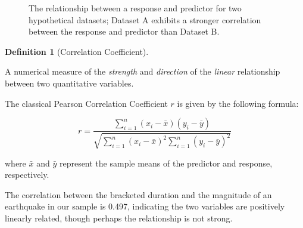\documentclass[
  letterpaper,
  DIV=11,
  numbers=noendperiod]{scrreprt}
\theoremstyle{definition}
\newtheorem{definition}{Definition}[chapter]
\theoremstyle{definition}
\theoremstyle{plain}
\theoremstyle{remark}
\begin{document}
\begin{figure}


\caption{\label{fig-regsummaries-correlation}The relationship between a
response and predictor for two hypothetical datasets; Dataset A exhibits
a stronger correlation between the response and predictor than Dataset
B.}

\end{figure}%

\begin{definition}[Correlation
Coefficient]\protect\hypertarget{def-correlation-coefficient}{}\label{def-correlation-coefficient}

A numerical measure of the \emph{strength} and \emph{direction} of the
\emph{linear} relationship between two quantitative variables.

The classical Pearson Correlation Coefficient \(r\) is given by the
following formula:

\[r = \frac{\sum_{i=1}^{n} \left(x_i - \bar{x}\right)\left(y_i - \bar{y}\right)}{\sqrt{\sum_{i=1}^n \left(x_i - \bar{x}\right)^2 \sum_{i=1}^n \left(y_i - \bar{y}\right)^2}}\]

where \(\bar{x}\) and \(\bar{y}\) represent the sample means of the
predictor and response, respectively.

\end{definition}

The correlation between the bracketed duration and the magnitude of an
earthquake in our sample is 0.497, indicating the two variables are
positively linearly related, though perhaps the relationship is not
strong.
\end{document}
